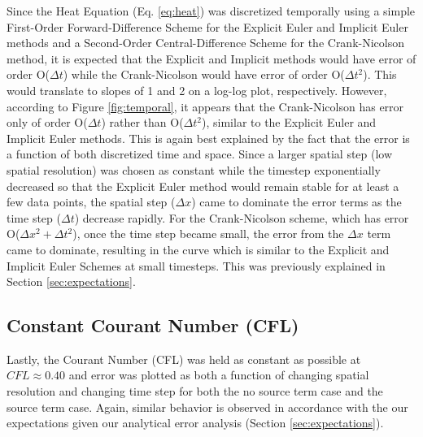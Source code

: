 \documentclass[10pt, letter, showtrims]{extarticle}
\begin{document}
		\noindent
		Since the Heat Equation (Eq. \ref{eq:heat}) was discretized temporally using a simple First-Order Forward-Difference Scheme for the Explicit Euler and Implicit Euler methods and a Second-Order Central-Difference Scheme for the Crank-Nicolson method, it is expected that the Explicit and Implicit methods would have error of order O($\Delta t$) while the Crank-Nicolson would have error of order O($\Delta t^{2}$). This would translate to slopes of 1 and 2 on a log-log plot, respectively. However, according to Figure \ref{fig:temporal}, it appears that the Crank-Nicolson has error only of order O($\Delta t$) rather than O($\Delta t^{2}$), similar to the Explicit Euler and Implicit Euler methods. This is again best explained by the fact that the error is a function of both discretized time and space. Since a larger spatial step (low spatial resolution) was chosen as constant while the timestep exponentially decreased so that the Explicit Euler method would remain stable for at least a few data points, the spatial step ($\Delta x$) came to dominate the error terms as the time step ($\Delta t$) decrease rapidly. For the Crank-Nicolson scheme, which has error O($\Delta x^{2} + \Delta t^{2}$), once the time step became small, the error from the $\Delta x$ term came to dominate, resulting in the curve which is similar to the Explicit and Implicit Euler Schemes at small timesteps. This was previously explained in Section \ref{sec:expectations}.
		
		\pagebreak
		
		\subsection{Constant Courant Number (CFL)}
		
		\noindent
		Lastly, the Courant Number (CFL) was held as constant as possible at $CFL \approx 0.40$ and error was plotted as both a function of changing spatial resolution and changing time step for both the no source term case and the source term case. Again, similar behavior is observed in accordance with the our expectations given our analytical error analysis (Section \ref{sec:expectations}). 
		
\end{document}
